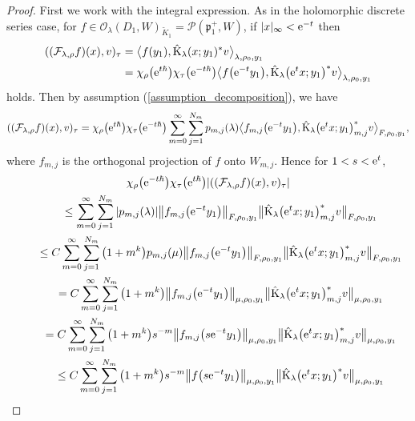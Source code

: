 \documentclass[pdftex]{sigma}
\numberwithin{equation}{section}
\newcommand{\fp}{\mathfrak{p}}
\newcommand{\cF}{\mathcal{F}}
\newcommand{\cO}{\mathcal{O}}
\newcommand{\cP}{\mathcal{P}}
\newcommand{\rK}{\mathrm{K}}
\begin{document}
\begin{proof}
First we work with the integral expression. As in the holomorphic discrete series case,
for $f\in\cO_\lambda(D_1,W)_{\tilde{K}_1}=\cP(\fp^+_1,W)$, if $|x|_\infty<{\rm e}^{-t}$ then
\begin{align*}
((\cF_{\lambda,\rho}f)(x),v)_\tau&=\big\langle f(y_1),\hat{\rK}_\lambda(x;y_1)^*v\big\rangle_{\lambda,\rho_0,y_1} \\
&=\chi_\rho\big({\rm e}^{t\hbar}\big)\chi_\tau\big({\rm e}^{-t\hbar}\big)\big\langle f\big({\rm e}^{-t}y_1\big),
\hat{\rK}_\lambda\big({\rm e}^tx;y_1\big)^*v\big\rangle_{\lambda,\rho_0,y_1}
\end{align*}
holds. Then by assumption (\ref{assumption_decomposition}), we have
\begin{gather*}
 ((\cF_{\lambda,\rho}f)(x),v)_\tau
=\chi_\rho\big({\rm e}^{t\hbar}\big)\chi_\tau\big({\rm e}^{-t\hbar}\big)\sum_{m=0}^\infty \sum_{j=1}^{N_m}
p_{m,j}(\lambda)\big\langle f_{m,j}\big({\rm e}^{-t}y_1\big),\hat{\rK}_\lambda\big({\rm e}^tx;y_1\big)^*_{m,j}v\big\rangle_{F,\rho_0,y_1},
\end{gather*}
where $f_{m,j}$ is the orthogonal projection of $f$ onto $W_{m,j}$. Hence for $1<s<{\rm e}^t$,
\begin{gather*}
 \chi_\rho\big({\rm e}^{-t\hbar}\big)\chi_\tau\big({\rm e}^{t\hbar}\big)|((\cF_{\lambda,\rho}f)(x),v)_\tau| \\
\qquad{}\le \sum_{m=0}^\infty \sum_{j=1}^{N_m}
|p_{m,j}(\lambda)|\big\Vert f_{m,j}\big({\rm e}^{-t}y_1\big)\big\Vert_{F,\rho_0,y_1}\big\Vert\hat{\rK}_\lambda\big({\rm e}^tx;y_1\big)^*_{m,j}v\big\Vert_{F,\rho_0,y_1} \\
\qquad{}\le C\sum_{m=0}^\infty \sum_{j=1}^{N_m}\big(1+m^k\big)
p_{m,j}(\mu)\big\Vert f_{m,j}\big({\rm e}^{-t}y_1\big)\big\Vert_{F,\rho_0,y_1}\big\Vert\hat{\rK}_\lambda\big({\rm e}^tx;y_1\big)^*_{m,j}v\big\Vert_{F,\rho_0,y_1} \\
\qquad{}=C\sum_{m=0}^\infty \sum_{j=1}^{N_m}\big(1+m^k\big)
\big\Vert f_{m,j}\big({\rm e}^{-t}y_1\big)\big\Vert_{\mu,\rho_0,y_1}\big\Vert\hat{\rK}_\lambda\big({\rm e}^tx;y_1\big)^*_{m,j}v\big\Vert_{\mu,\rho_0,y_1} \\
\qquad{}=C\sum_{m=0}^\infty \sum_{j=1}^{N_m}\big(1+m^k\big)
s^{-m}\big\Vert f_{m,j}\big(s{\rm e}^{-t}y_1\big)\big\Vert_{\mu,\rho_0,y_1}\big\Vert\hat{\rK}_\lambda\big({\rm e}^tx;y_1\big)^*_{m,j}v\big\Vert_{\mu,\rho_0,y_1} \\
\qquad{}\le C\sum_{m=0}^\infty \sum_{j=1}^{N_m}\big(1+m^k\big)
s^{-m}\big\Vert f\big(s{\rm e}^{-t}y_1\big)\big\Vert_{\mu,\rho_0,y_1}\big\Vert\hat{\rK}_\lambda\big({\rm e}^tx;y_1\big)^*v\big\Vert_{\mu,\rho_0,y_1} \\

\end{gather*}
\end{proof}
\end{document}
